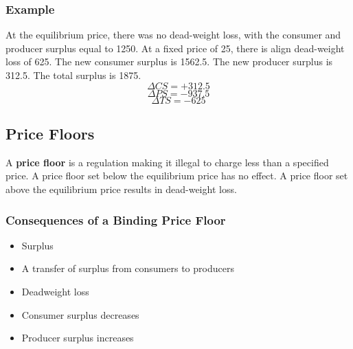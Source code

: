 \documentclass[letterpaper, 12pt]{article}
\begin{document}
\subsubsection{Example}
\begin{center}
\end{center}
At the equilibrium price, there was no dead-weight loss, with the consumer
and producer surplus equal to 1250. At a fixed price of 25, there is align
dead-weight loss of 625. The new consumer surplus is 1562.5. The new
producer surplus is 312.5. The total surplus is 1875.
\[ \Delta CS = +312.5 \]
\[ \Delta PS = -937.5 \]
\[ \Delta TS = -625 \]

\subsection{Price Floors}
A \textbf{price floor} is a regulation making it illegal to charge less than a
specified price. A price floor set below the equilibrium price has no effect.
A price floor set above the equilibrium price results in dead-weight loss.

\subsubsection{Consequences of a Binding Price Floor}
\begin{itemize}
  \item Surplus
  \item A transfer of surplus from consumers to producers
  \item Deadweight loss
  \item Consumer surplus decreases
  \item Producer surplus increases
\end{itemize}
\end{document}
